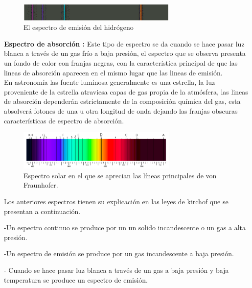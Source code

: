  \begin{figure}[htb!]
\centering
\includegraphics[width=0.7\textwidth]{images/2.png}
\caption[Descripción versión comprimida]{El espectro de emisión del hidrógeno \cite{articulo1}}
 \label{fig3}
\end{figure}


\textbf{Espectro de absorción :} Este tipo de espectro se da cuando se hace pasar luz blanca a través de un gas frío a baja presión, el espectro que se observa presenta un fondo de color con franjas negras, con la característica principal de que las lineas de absorción aparecen en el mismo lugar que las lineas de emisión.\\
En astronomía las fuente luminosa generalmente es una estrella, la luz proveniente de la estrella atraviesa capas de gas propia de la atmósfera, las lineas de absorción dependerán estrictamente de la composición química del gas, esta absolverá fotones de una u otra longitud de onda dejando las franjas obscuras características de espectro de absorción.


\begin{figure}[htb!]
\centering
\includegraphics[width=0.7\textwidth]{images/3.png}
\caption[Descripción versión comprimida]{Espectro solar en el que se aprecian las líneas principales de von Fraunhofer. \cite{articulo1}}
 \label{fig4}
\end{figure}


Los anteriores espectros tienen su explicación en las leyes de kirchof  que se presentan a continuación.

-Un espectro continuo se produce por un un solido incandescente o un gas a alta presión.

-Un espectro de emisión se produce por un gas incandescente a baja presión.

- Cuando se hace pasar luz blanca a través de un gas a baja presión y baja temperatura se produce un espectro de emisión.

